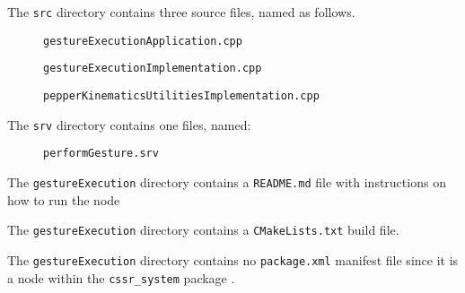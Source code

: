 \documentclass{CSSRforAfrica}
\newcommand{\checkboxChecked}{\fbox{\ding{51}}} %
\newcommand{\checkboxDashed}{\fbox{--}}         %
\begin{document}
\begin{description}
\newpage
\item[\checkboxChecked] The  {\small \verb+src+} directory contains three source files, named as follows.
\begin{description}
\item[\checkboxChecked] {\small \verb+gestureExecutionApplication.cpp+}  
\item[\checkboxChecked]  {\small \verb+gestureExecutionImplementation.cpp+}  
\item[\checkboxChecked]  {\small \verb+pepperKinematicsUtilitiesImplementation.cpp+}  
\end{description} 

\item[\checkboxChecked] The  {\small \verb+srv+} directory contains one files, named:
\begin{description}
\item[\checkboxChecked] {\small \verb+performGesture.srv+}  
\end{description} 

\item[\checkboxChecked] The {\small \verb+gestureExecution+} directory contains  a {\small \verb+README.md+} file with  instructions on how to run the node 
\item[\checkboxChecked] The {\small \verb+gestureExecution+} directory contains  a {\small \verb+CMakeLists.txt+} build file.
\item[\checkboxChecked] The {\small \verb+gestureExecution+} directory contains  no {\small \verb+package.xml+} manifest file since it is a node within the {\small \verb+cssr_system+} package .

\end{description}
\end{document}
